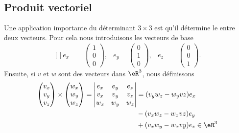 \subsection{Produit vectoriel}

Une application importante du déterminant $3\times 3$ est qu'il détermine le  entre deux vecteurs. Pour cela nous introduisons les vecteurs de base
\begin{equation}
    \begin{aligned}[]
        e_x&=\begin{pmatrix}
            1    \\ 
            0    \\ 
            0    
        \end{pmatrix}
        ,&e_y=\begin{pmatrix}
            0    \\ 
            1    \\ 
            0    
        \end{pmatrix},&e_z&=\begin{pmatrix}
            0    \\ 
            0    \\ 
            1    
        \end{pmatrix}.
    \end{aligned}
\end{equation}
Ensuite, si $v$ et $w$ sont des vecteurs dans $\eR^3$, nous définissons
\begin{equation}
    \begin{aligned}[]
        \begin{pmatrix}
            v_x    \\ 
            v_y    \\ 
            v_z    
        \end{pmatrix}\times\begin{pmatrix}
            w_x    \\ 
            w_y    \\ 
            w_z    
        \end{pmatrix}=
        \begin{vmatrix}
              e_x  &   e_y    &   e_z    \\
              v_x  &   v_y    &   v_z    \\
              w_x  &   w_y    &   w_z    \\
        \end{vmatrix}&=
        (v_yw_z-w_yvz)e_x\\
        &-(v_xw_z-w_xvz)e_y\\
        &+(v_xw_y-w_xvy)e_z\in\eR^3
    \end{aligned}
\end{equation}

